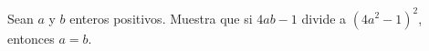 Sean $a$ y $b$ enteros positivos. Muestra que si $4ab-1$ divide a $(4a^{2} - 1)^{2}$, entonces $a=b$.